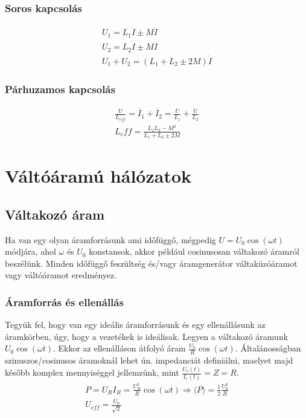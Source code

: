 \documentclass{article}
\begin{document}
\subsubsection{Soros kapcsolás}
\begin{gather*}
U_1 = L_1 \dot{I} \pm M \dot{I} \\
U_2 = L_2 \dot{I} \pm M \dot{I} \\
U_1+U_2 = (L_1 +L_2 \pm 2M)\dot{I}
\end{gather*}
\subsubsection{Párhuzamos kapcsolás}
\begin{gather*}
\frac{U}{L_{eff}} = \dot{I_1} + \dot{I_2} = \frac{U}{L_1} + \frac{U}{L_2} \\
L_eff = \frac{L_1L_2-M^2}{L_1+L_2 \pm 2M}
\end{gather*}
\newpage
\section{Váltóáramú hálózatok}
\subsection{Váltakozó áram}
Ha van egy olyan áramforrásunk ami időfüggő, mégpedig $U=U_0 \cos(\omega t)$ módjára, ahol $\omega$ és $U_0$ konstansok, akkor például cosinusosan váltakozó áramról beszélünk. Minden időfüggő feszültség és/vagy áramgenerátor váltaküzóáramot vagy váltóáramot eredményez. 
\subsubsection{Áramforrás és ellenállás}
Tegyük fel, hogy van egy ideális áramforrásunk és egy ellenállásunk az áramkörben, úgy, hogy a vezetékek is ideálisak. Legyen a váltakozó áramunk $U_0 \cos(\omega t)$. Ekkor az ellenálláson átfolyó áram $\frac{U_0}{R}\cos(\omega t)$. Általánosságban szinuszos/cosinusos áramoknál lehet ún. impedanciát definiálni, maelyet majd később komplex mennyiséggel jellemzünk, mint $\frac{U_r(t)}{I_r(t)} = Z = R$. 
\begin{gather*}
P=U_R I_R = \frac{U_R^2}{R} \cos(\omega t) \Rightarrow \langle P \rangle = \frac{1}{2} \frac{U_0^2}{R} \\
U_{eff} = \frac{U_0}{\sqrt{2}}
\end{gather*}
\end{document}
